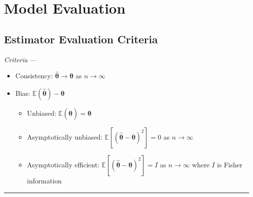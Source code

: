 \section{Model Evaluation}
\subsection*{Estimator Evaluation Criteria}
\emph{Criteria} --- 
\begin{itemize}
    \item Consistency: $\hat{\boldsymbol{\theta}} \rightarrow \boldsymbol{\theta}$ as $n \rightarrow \infty$
    \item Bias: $\mathbb{E}(\hat{\boldsymbol{\theta}}) - \boldsymbol{\theta}$
    \begin{itemize}
        \item Unbiased: $\mathbb{E}(\hat{\boldsymbol{\theta}}) = \boldsymbol{\theta}$
        \item Asymptotically unbiased: $\mathbb{E} [ ( \hat{\boldsymbol{\theta}} - \boldsymbol{\theta} )^2 ] = 0$ as $n \rightarrow \infty$ 
        \item Asymptotically efficient: $\mathbb{E} [ ( \hat{\boldsymbol{\theta}} - \boldsymbol{\theta} )^2 ] = I$ as $n \rightarrow \infty$  where $I$ is Fisher information 
    \end{itemize}
\end{itemize}

{\color{black}\hrule height 0.001mm}

